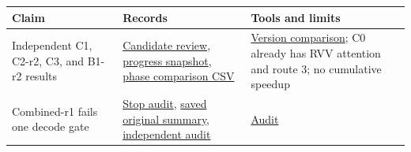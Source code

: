 \documentclass[10pt,a4paper]{article}
\begin{document}
\begin{longtable}[]{@{}lll@{}}
\toprule
\begin{minipage}[b]{0.30\columnwidth}\raggedright
Claim\strut
\end{minipage} & \begin{minipage}[b]{0.30\columnwidth}\raggedright
Records\strut
\end{minipage} & \begin{minipage}[b]{0.30\columnwidth}\raggedright
Tools and limits\strut
\end{minipage}\tabularnewline
\midrule
\endhead
\begin{minipage}[t]{0.30\columnwidth}\raggedright
Independent C1, C2-r2, C3, and B1-r2 results\strut
\end{minipage} & \begin{minipage}[t]{0.30\columnwidth}\raggedright
\href{https://github.com/MoyaMryia/riscv-accl/blob/main/spacemit/reports/2026-10-09-local-candidate-result-rejudgment.md}{Candidate
review},
\href{https://github.com/MoyaMryia/riscv-accl/blob/main/spacemit/reports/2026-10-11-project-progress.md}{progress
snapshot},
\href{https://github.com/MoyaMryia/riscv-accl/blob/main/spacemit/reports/2026-10-11-original-current-comparison.csv}{phase
comparison CSV}\strut
\end{minipage} & \begin{minipage}[t]{0.30\columnwidth}\raggedright
\href{https://github.com/MoyaMryia/riscv-accl/blob/main/spacemit/reports/2026-10-11-original-current-comparison.md}{Version
comparison}; C0 already has RVV attention and route 3; no cumulative
speedup\strut
\end{minipage}\tabularnewline
\begin{minipage}[t]{0.30\columnwidth}\raggedright
Combined-r1 fails one decode gate\strut
\end{minipage} & \begin{minipage}[t]{0.30\columnwidth}\raggedright
\href{https://github.com/MoyaMryia/riscv-accl/blob/main/spacemit/reports/2026-10-12-combined-stop-audit.md}{Stop
audit},
\href{https://github.com/MoyaMryia/riscv-accl/blob/main/spacemit/reports/raw/k1-combined-stop-audit-20261012/input/summary.json}{saved
original summary},
\href{https://github.com/MoyaMryia/riscv-accl/blob/main/spacemit/reports/raw/k1-combined-stop-audit-20261012/local-audit.json}{independent
audit}\strut
\end{minipage} & \begin{minipage}[t]{0.30\columnwidth}\raggedright
\href{https://github.com/MoyaMryia/riscv-accl/blob/main/spacemit/bench/local-candidates/audit-combined-stop.py}{Audit
}
\end{minipage}
\end{longtable}
\end{document}
